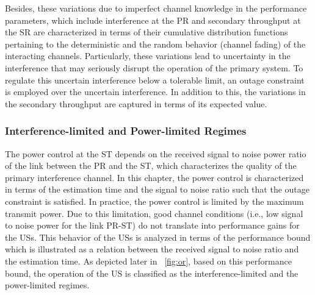 Besides, these variations due to imperfect channel knowledge in the performance parameters, which include interference at the PR and secondary throughput at the SR are characterized in terms of their cumulative distribution functions pertaining to the deterministic  and the random behavior (channel fading) of the interacting channels. Particularly, these variations lead to uncertainty in the interference that may seriously disrupt the operation of the primary system. To regulate this uncertain interference below a tolerable limit, an outage constraint is employed over the uncertain interference. In addition to this, the variations in the secondary throughput are captured in terms of its expected value.

\subsubsection{Interference-limited and Power-limited Regimes}
The power control at the ST depends on the received signal to noise power ratio of the link between the PR and the ST, which characterizes the quality of the primary interference channel. In this chapter, the power control is characterized in terms of the estimation time and the signal to noise ratio such that the outage constraint is satisfied. In practice, the power control is limited by the maximum transmit power. Due to this limitation, good channel conditions (i.e., low signal to noise power for the link PR-ST) do not translate into performance gains for the USs. This behavior of the USs is analyzed in terms of the performance bound which is illustrated as a relation between the received signal to noise ratio and the estimation time. As depicted later in \figurename~\ref{fig:or}, based on this performance bound, the operation of the US is classified as the interference-limited and the power-limited regimes.

